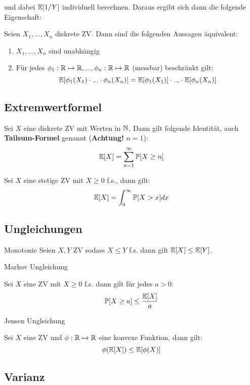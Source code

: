 und dabei $\mathbb{E} [1 / Y]$ individuell berechnen. Daraus ergibt sich dann die folgende Eigenschaft:

\begin{mainbox}{}
    Seien $X_1,...,X_n$ diskrete ZV. Dann sind die folgenden Aussagen äquivalent:
    \begin{enumerate}
        \item $X_1,...,X_n$ sind unabhängig
        \item Für jedes $\phi_1: \mathbb{R} \mapsto \mathbb{R},..., \phi_n: \mathbb{R} \mapsto \mathbb{R}$ (messbar) beschränkt gilt:
        $$\mathbb{E}[\phi_1(X_1) \cdot ... \cdot \phi_n(X_n)] = \mathbb{E}[\phi_1(X_1)] \cdot ... \cdot \mathbb{E}[\phi_n(X_n)]$$
    \end{enumerate}
\end{mainbox}


\subsection{Extremwertformel}

Sei $X$ eine diskrete ZV mit Werten in $\mathbb{N}$. Dann gilt folgende Identität, auch \textbf{Tailsum-Formel} genannt (\textbf{Achtung!} $n=1$):
$$\mathbb{E}[X] = \sum_{n=1}^\infty \mathbb{P}[X \geq n]$$

Sei $X$ eine stetige ZV mit $X \geq 0$ f.s., dann gilt:
$$\mathbb{E}[X] = \int_0^\infty \mathbb{P}[X > x] dx$$


\subsection{Ungleichungen}

\begin{mainbox}{Monotonie} Seien $X,Y$ ZV sodass $X \leq Y$ f.s. dann gilt $\mathbb{E}[X] \leq \mathbb{E}[Y]$. \end{mainbox}

\begin{mainbox}
    {Markov Ungleichung} 
    
    Sei $X$ eine ZV mit $X \geq 0$ f.s. dann gilt für jedes $a > 0$:
    $$\mathbb{P}[X \geq a] \leq \frac{\mathbb{E}[X]}{a}$$
\end{mainbox}

\begin{mainbox}
    {Jensen Ungleichung} 
    
    Sei $X$ eine ZV und $\phi: \mathbb{R} \mapsto \mathbb{R}$ eine konvexe Funktion, dann gilt:
    $$\phi(\mathbb{E}[X]) \leq \mathbb{E}[\phi(X)]$$
\end{mainbox}


\subsection{Varianz}


